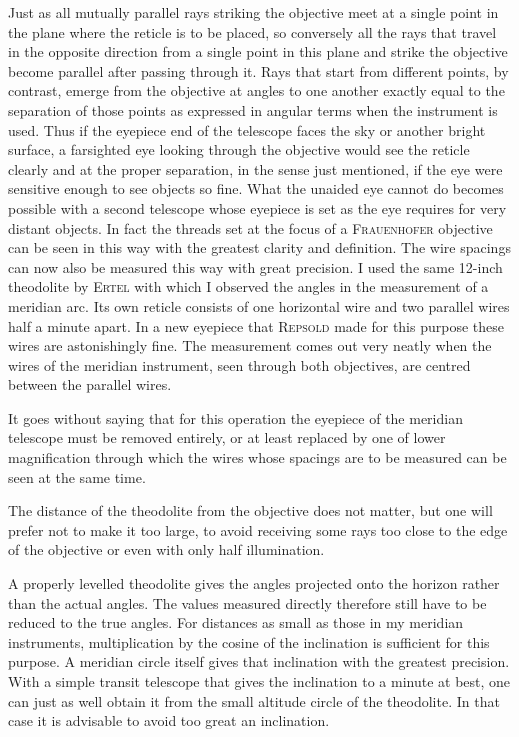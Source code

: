 Just as all mutually parallel rays striking the objective meet at a single point in the plane where the reticle is to be placed, so conversely all the rays that travel in the opposite direction from a single point in this plane and strike the objective become parallel after passing through it. Rays that start from different points, by contrast, emerge from the objective at angles to one another exactly equal to the separation of those points as expressed in angular terms when the instrument is used. Thus if the eyepiece end of the telescope faces the sky or another bright surface, a farsighted eye looking through the objective would see the reticle clearly and at the proper separation, in the sense just mentioned, if the eye were sensitive enough to see objects so fine. What the unaided eye cannot do becomes possible with a second telescope whose eyepiece is set as the eye requires for very distant objects. In fact the threads set at the focus of a \textsc{Frauenhofer} objective can be seen in this way with the greatest clarity and definition.
The wire spacings can now also be measured this way with great precision. I used the same 12-inch theodolite by \textsc{Ertel} with which I observed the angles in the measurement of a meridian arc. Its own reticle consists of one horizontal wire and two parallel wires half a minute apart. In a new eyepiece that \textsc{Repsold} made for this purpose these wires are astonishingly fine. The measurement comes out very neatly when the wires of the meridian instrument, seen through both objectives, are centred between the parallel wires.

It goes without saying that for this operation the eyepiece of the meridian telescope must be removed entirely, or at least replaced by one of lower magnification through which the wires whose spacings are to be measured can be seen at the same time.

The distance of the theodolite from the objective does not matter, but one will prefer not to make it too large, to avoid receiving some rays too close to the edge of the objective or even with only half illumination.

%
A properly levelled theodolite gives the angles projected onto the horizon rather than the actual angles. The values measured directly therefore still have to be reduced to the true angles. For distances as small as those in my meridian instruments, multiplication by the cosine of the inclination is sufficient for this purpose. A meridian circle itself gives that inclination with the greatest precision. With a simple transit telescope that gives the inclination to a minute at best, one can just as well obtain it from the small altitude circle of the theodolite. In that case it is advisable to avoid too great an inclination.

